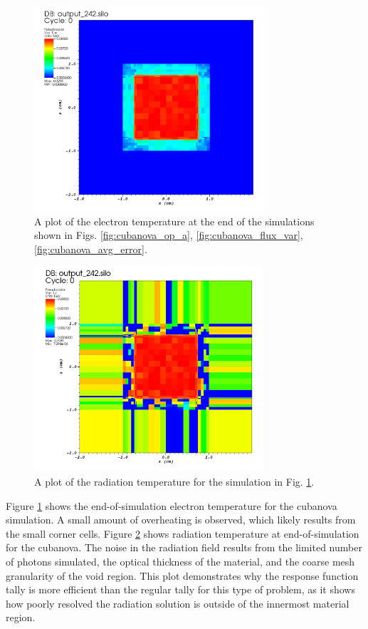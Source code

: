 \documentclass[]{article}
\begin{document}
		\begin{figure} [h!]
			\centering
			\includegraphics[height=3in]{Figures/cubanova_T_e.png}
			\caption{A plot of the electron temperature at the end of the simulations shown in Figs. \ref{fig:cubanova_op_a}, \ref{fig:cubanova_flux_var}, \ref{fig:cubanova_avg_error}. }
			\label{fig:cubanova_T_e}
		\end{figure}
	
		\begin{figure} [h!]
			\centering
			\includegraphics[height=3in]{Figures/cubanova_T_r.png}
			\caption{A plot of the radiation temperature for the simulation in Fig. \ref{fig:cubanova_T_e}.}
			\label{fig:cubanova_T_r}
		\end{figure}
	
    Figure \ref{fig:cubanova_T_e} shows the end-of-simulation electron temperature for the cubanova simulation. A small amount of overheating is observed, which likely results from the small corner cells. Figure \ref{fig:cubanova_T_r} shows radiation temperature at end-of-simulation for the cubanova. The noise in the radiation field results from the limited number of photons simulated, the optical thickness of the material, and the coarse mesh granularity of the void region. This plot demonstrates why the response function tally is more efficient than the regular tally for this type of problem, as it shows how poorly resolved the radiation solution is outside of the innermost material region.
\end{document}
